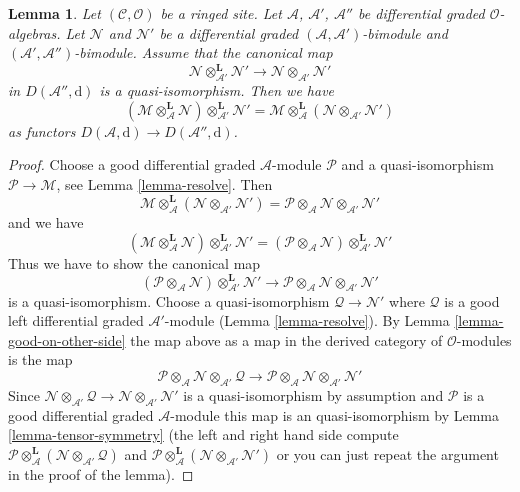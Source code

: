 \documentclass[10pt,a4paper]{amsart}
\theoremstyle{plain}
\newtheorem{lemma}[subsection]{Lemma}
\theoremstyle{definition}
\theoremstyle{remark}
\numberwithin{equation}{subsection}
\begin{document}
\begin{lemma}
\label{lemma-compose-tensor}
Let $(\mathcal{C}, \mathcal{O})$ be a ringed site. Let
$\mathcal{A}$, $\mathcal{A}'$, $\mathcal{A}''$ be differential graded
$\mathcal{O}$-algebras. Let $\mathcal{N}$ and $\mathcal{N}'$ be a
differential graded $(\mathcal{A}, \mathcal{A}')$-bimodule
and $(\mathcal{A}', \mathcal{A}'')$-bimodule. Assume
that the canonical map
$$
\mathcal{N} \otimes_{\mathcal{A}'}^\mathbf{L} \mathcal{N}'
\longrightarrow
\mathcal{N} \otimes_{\mathcal{A}'} \mathcal{N}'
$$
in $D(\mathcal{A}'', \text{d})$ is a quasi-isomorphism.
Then we have
$$
(\mathcal{M}
\otimes_\mathcal{A}^\mathbf{L} \mathcal{N})
\otimes_{\mathcal{A}'}^\mathbf{L} \mathcal{N}'
=
\mathcal{M}
\otimes_\mathcal{A}^\mathbf{L}
(\mathcal{N} \otimes_{\mathcal{A}'} \mathcal{N}')
$$
as functors $D(\mathcal{A}, \text{d}) \to D(\mathcal{A}'', \text{d})$.
\end{lemma}

\begin{proof}
Choose a good differential graded $\mathcal{A}$-module
$\mathcal{P}$ and a quasi-isomorphism $\mathcal{P} \to \mathcal{M}$, see
Lemma \ref{lemma-resolve}. Then
$$
\mathcal{M}
\otimes_\mathcal{A}^\mathbf{L}
(\mathcal{N} \otimes_{\mathcal{A}'} \mathcal{N}') =
\mathcal{P} \otimes_\mathcal{A} \mathcal{N}
\otimes_{\mathcal{A}'} \mathcal{N}'
$$
and we have
$$
(\mathcal{M}
\otimes_\mathcal{A}^\mathbf{L} \mathcal{N})
\otimes_{\mathcal{A}'}^\mathbf{L} \mathcal{N}' =
(\mathcal{P} \otimes_\mathcal{A} \mathcal{N})
\otimes_{\mathcal{A}'}^\mathbf{L} \mathcal{N}'
$$
Thus we have to show the canonical map
$$
(\mathcal{P} \otimes_\mathcal{A} \mathcal{N})
\otimes_{\mathcal{A}'}^\mathbf{L} \mathcal{N}'
\longrightarrow
\mathcal{P} \otimes_\mathcal{A} \mathcal{N}
\otimes_{\mathcal{A}'} \mathcal{N}'
$$
is a quasi-isomorphism. Choose a quasi-isomorphism
$\mathcal{Q} \to \mathcal{N}'$ where $\mathcal{Q}$
is a good left differential graded $\mathcal{A}'$-module
(Lemma \ref{lemma-resolve}).
By Lemma \ref{lemma-good-on-other-side} the map
above as a map in the derived category of $\mathcal{O}$-modules is the map
$$
\mathcal{P} \otimes_\mathcal{A} \mathcal{N}
\otimes_{\mathcal{A}'} \mathcal{Q}
\longrightarrow
\mathcal{P} \otimes_\mathcal{A} \mathcal{N}
\otimes_{\mathcal{A}'} \mathcal{N}'
$$
Since $\mathcal{N} \otimes_{\mathcal{A}'} \mathcal{Q} \to
\mathcal{N} \otimes_{\mathcal{A}'} \mathcal{N}'$ is a quasi-isomorphism
by assumption and $\mathcal{P}$ is a good differential graded
$\mathcal{A}$-module this map is an quasi-isomorphism by
Lemma \ref{lemma-tensor-symmetry} (the left and right hand side
compute $\mathcal{P} \otimes_\mathcal{A}^\mathbf{L} (\mathcal{N}
\otimes_{\mathcal{A}'} \mathcal{Q})$ and
$\mathcal{P} \otimes_\mathcal{A}^\mathbf{L} (\mathcal{N}
\otimes_{\mathcal{A}'} \mathcal{N}')$ or you can just repeat
the argument in the proof of the lemma).
\end{proof}
\end{document}
